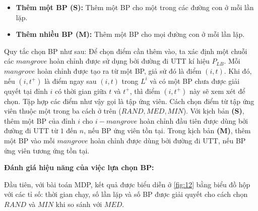 \documentclass[../main.tex]{subfiles}
\begin{document}
\begin{itemize}
\tightlist
\item
  \textbf{Thêm một BP (S):} Thêm một BP cho một trong các
  đường con ở mỗi lần lặp.
\item
  \textbf{Thêm nhiều BP (M):} Thêm một BP cho mọi đường
  con ở mỗi lần lặp.
\end{itemize}

Quy tắc chọn BP như sau: Để chọn điểm cần thêm vào, ta xác định
một chuỗi các \(mangrove\) hoàn chỉnh được sử dụng bởi đường đi UTT kí
hiệu \(P_{LB}\). Mỗi \(mangrove\) hoàn chỉnh được tạo ra từ một BP, giả
sử đó là điểm \((i,t)\). Khi đó, nếu \((i,t^+)\) là điểm ngay sau
\((i,t)\) trong \(L^i\) và có một BP chưa được giải quyết tại đỉnh \(i\)
có thời gian giữa \(t\) và \(t^+\), thì điểm \((i,t^+)\) này sẽ xem xét
để chọn. Tập hợp các điểm như vậy gọi là tập ứng viên. Cách chọn điểm từ
tập ứng viên thuộc một trong ba cách ở trên (\(RAND, MED, MIN\)). Với
kịch bản \textbf{(S)}, thêm một BP của đỉnh \(i\) cho \(i-mangrove\)
hoàn chỉnh đầu tiên được dùng bởi đường đi UTT từ \(1\) đến \(n\), nếu
BP ứng viên tồn tại. Trong kịch bản \textbf{(M)}, thêm một BP vào mỗi
\(mangrove\) hoàn chỉnh được dùng bởi đường đi UTT, nếu BP ứng viên
tương ứng tồn tại.

\textbf{Đánh giá hiệu năng của việc lựa chọn BP:}

Đầu tiên, với bài toán MDP, kết quả được biểu diễn ở \autoref{fig:12} bằng biểu
đồ hộp với các tỉ số: thời gian chạy, số lần lặp và số BP được giải
quyết cho cách chọn \(RAND\) và \(MIN\) khi so sánh với \(MED\).

\end{document}
